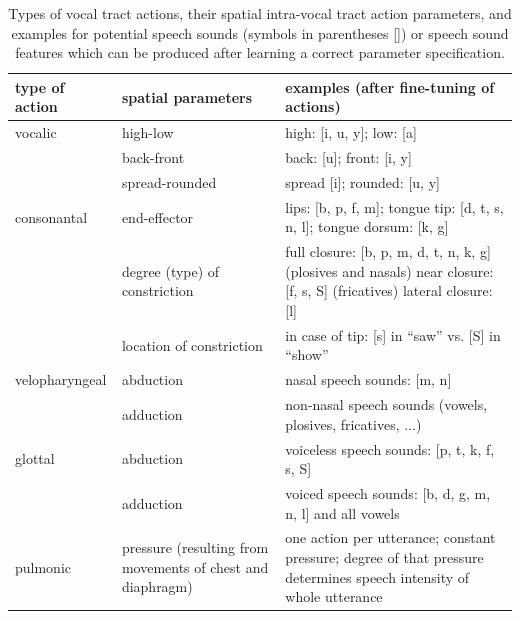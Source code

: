 \documentclass[conference]{IEEEtran}
\begin{document}
\begin{table}[!t]
\renewcommand{\arraystretch}{1.3}
\caption{Types of vocal tract actions, their spatial intra-vocal tract
  action parameters, and examples for potential speech sounds (symbols
  in parentheses []) or speech sound features which can be produced
  after learning a correct parameter specification.}
\label{tab:actions}
\centering
\begin{tabular}{l|p{2.5cm}|p{4cm}}
  type of action & spatial parameters & examples (after fine-tuning of
  actions)\\
  \hline
  vocalic & high-low & high: [i, u, y]; low: [a]\\
  ~ & back-front & back: [u]; front: [i, y]\\
  ~ & spread-rounded & spread [i]; rounded: [u, y]\\
  \hline
  consonantal & end-effector & lips: [b, p, f, m];
  tongue tip: [d, t, s, n, l]; tongue dorsum: [k, g]\\
  ~ & degree (type) of constriction &
  full closure: [b, p, m, d, t, n, k, g] (plosives and nasals) \newline
  near closure: [f, s, S] (fricatives) \newline
  lateral closure: [l]\\
  ~ & location of constriction & in case of tip: [s] in ``saw''
  vs. [S] in ``show''\\
  \hline
  velopharyngeal & abduction & nasal speech sounds: [m, n]\\
  ~ & adduction & non-nasal speech sounds (vowels, plosives, fricatives,
  ...)\\
  \hline
  glottal & abduction & voiceless speech sounds: [p, t, k, f, s, S]\\
  ~ & adduction & voiced speech sounds: [b, d, g, m, n, l] and all
  vowels\\
  pulmonic & pressure (resulting from movements of chest and diaphragm)
  & one action per utterance; constant pressure;
  degree of that pressure determines speech intensity of whole utterance
\end{tabular}
\end{table}
\end{document}
